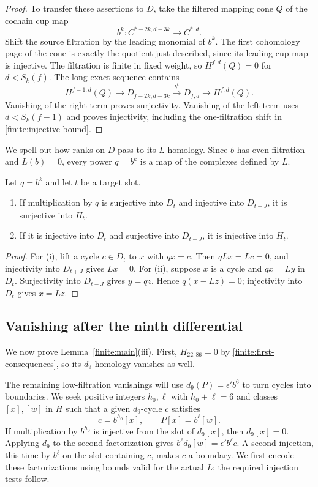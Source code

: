 \begin{proof}
To transfer these assertions to $D$, take the filtered mapping cone
$Q$ of the cochain cup map
\[
 b^k\colon C^{*-2k,d-3k}\longrightarrow C^{*,d}.
\]
Shift the source filtration by the leading monomial of $b^k$.
The first cohomology page of the cone is exactly the quotient just
described, since its leading cup map is injective.  The filtration
is finite in fixed weight, so $H^{f,d}(Q)=0$ for $d<S_k(f)$.
The long exact sequence contains
\[
 H^{f-1,d}(Q)\longrightarrow D_{f-2k,d-3k}
 \xrightarrow{\ b^k\ }D_{f,d}\longrightarrow H^{f,d}(Q).
\]
Vanishing of the right term proves surjectivity.  Vanishing of the
left term uses $d<S_k(f-1)$ and proves injectivity, including the
one-filtration shift in \eqref{finite:injective-bound}.
\end{proof}

We spell out how ranks on $D$ pass to its $L$-homology.  Since $b$
has even filtration and $L(b)=0$, every power $q=b^k$ is a map of
the complexes defined by $L$.

\begin{lemma}\label{finite:homology-transfer}
Let $q=b^k$ and let $t$ be a target slot.
\begin{enumerate}[label=\textup{(\roman*)}]
 \item If multiplication by $q$ is surjective into $D_t$ and
 injective into $D_{t+J}$, it is surjective into $H_t$.
 \item If it is injective into $D_t$ and surjective into
 $D_{t-J}$, it is injective into $H_t$.
\end{enumerate}
\end{lemma}
\begin{proof}
For (i), lift a cycle $c\in D_t$ to $x$ with $qx=c$.
Then $qLx=Lc=0$, and injectivity into $D_{t+J}$ gives $Lx=0$.
For (ii), suppose $x$ is a cycle and $qx=Ly$ in $D_t$.
Surjectivity into $D_{t-J}$ gives $y=qz$.  Hence
$q(x-Lz)=0$; injectivity into $D_t$ gives $x=Lz$.
\end{proof}

\subsection{Vanishing after the ninth differential}

We now prove Lemma~\ref{finite:main}\textup{(iii)}.  First,
$H_{22,86}=0$ by \eqref{finite:first-consequences}, so its
$d_9$-homology vanishes as well.

The remaining low-filtration vanishings will use
$d_9(P)=\epsilon'b^6$ to turn cycles into boundaries.  We seek
positive integers $h_0,\ell$ with $h_0+\ell=6$ and classes $[x],[w]$
in $H$ such that a given $d_9$-cycle $c$ satisfies
\[
 c=b^{h_0}[x],\qquad P[x]=b^\ell[w].
\]
If multiplication by $b^{h_0}$ is injective from the slot of
$d_9[x]$, then $d_9[x]=0$.  Applying $d_9$ to the second
factorization gives $b^\ell d_9[w]=\epsilon'b^\ell c$.
A second injection, this time by $b^\ell$ on the slot containing
$c$, makes $c$ a boundary.  We first encode these factorizations
using bounds valid for the actual $L$; the required injection
tests follow.


